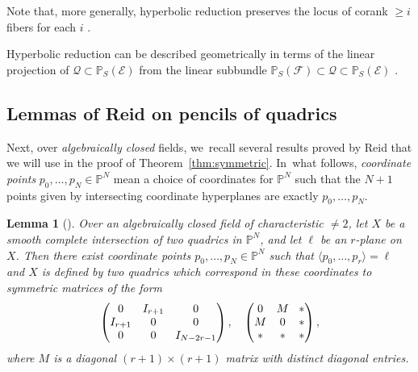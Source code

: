 \documentclass[10pt,a4paper]{amsart}
\let\cal\mathcal
\let\bb\mathbb\let\Bbb\mathbb
\theoremstyle{plain}
\newtheorem{lem}[thm]{Lemma}
\theoremstyle{definition}
\newcommand{\defi}[1]{\emph{#1}}
\renewcommand\P{\mathbb{P}}
\begin{document}
Note that, more generally, hyperbolic reduction preserves the locus of corank \(\geq i\) fibers for each \(i\) \cite[Lem.\,2.4]{KuznetsovShinder18}.

Hyperbolic reduction can be described geometrically in terms of the linear projection of \(\cal Q\subset\bb P_S(\cal E)\) from the linear subbundle \(\bb P_S(\cal F)\subset\cal Q\subset\bb P_S(\cal E)\) \cite[Prop.\,2.5]{KuznetsovShinder18}.

\subsection{Lemmas of Reid on pencils of quadrics}

Next, over \emph{algebraically closed} fields, we~recall several results proved by Reid \cite{Reid-thesis} that we will use in the proof of Theorem~\ref{thm:symmetric}. In~what follows, \defi{coordinate points} $p_0,\dots, p_N\in \P^N$ mean a choice of coordinates for $\P^N$ such that the $N+1$ points given by intersecting coordinate hyperplanes are exactly $p_0,\dots, p_N$.

\begin{lem}[{\cite[Lem.\,2.2]{Reid-thesis}}]\label{lem:reid_1}
Over an algebraically closed field of characteristic $\neq 2$, let $X$ be a smooth complete intersection of two quadrics in $\P^N$, and let $\ell$ be an $r$-plane on $X$.
Then there exist coordinate points $p_0,\dots, p_N\in \P^N$ such that $\langle p_0,\dots, p_r\rangle =\ell$ and $X$ is defined by two quadrics which correspond in these coordinates to symmetric matrices of the form\vspace*{-3pt}
\[
\begin{pmatrix}
0 & I_{r+1} & 0\\
I_{r+1} & 0 & 0\\
0 & 0 & I_{N-2r-1}
\end{pmatrix}, \quad\arraycolsep4.5pt
\begin{pmatrix}
0 & M & *\\
M & 0 & *\\
* & * & *
\end{pmatrix},
\]
where $M$ is a diagonal \((r+1)\times(r+1)\) matrix with distinct diagonal entries.
\end{lem}
\end{document}
